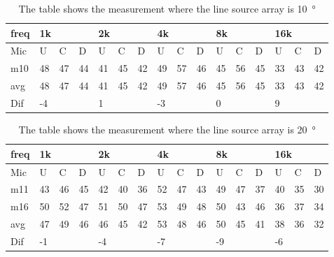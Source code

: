 \begin{table}[H]
\centering
\caption{The table shows the measurement where the line source array is \SI{10}{\degree}}
\begin{tabular}{l|l|l|l|l|l|l|l|l|l|l|l|l|lll}
freq & \multicolumn{3}{l|}{1k} & \multicolumn{3}{l|}{2k} & \multicolumn{3}{l|}{4k} & \multicolumn{3}{l|}{8k} & \multicolumn{3}{l}{16k}                                \\ \hline
Mic  & U      & C      & D     & U      & C      & D     & U      & C      & D     & U      & C      & D     & \multicolumn{1}{l|}{U}  & \multicolumn{1}{l|}{C}  & D  \\ \hline
m10   &  48    &  47    &  44    & 41     &  45    &  42    & 49     &  57     &  46    &  45     &  56    &  45    & \multicolumn{1}{l|}{33} & \multicolumn{1}{l|}{43} & 42 \\ \hline
avg &  48    &  47    &  44    & 41     &  45    &  42    & 49     &  57     &  46    &  45     &  56    &  45    & \multicolumn{1}{l|}{33} & \multicolumn{1}{l|}{43} & 42  \\ \hline  
Dif & \multicolumn{3}{l|}{-4} & \multicolumn{3}{l|}{1} & \multicolumn{3}{l|}{-3} & \multicolumn{3}{l|}{0} & \multicolumn{3}{l}{9}                                
\end{tabular}
\end{table}

\begin{table}[H]
\centering
\caption{The table shows the measurement where the line source array is \SI{20}{\degree}}
\begin{tabular}{l|l|l|l|l|l|l|l|l|l|l|l|l|lll}
freq & \multicolumn{3}{l|}{1k} & \multicolumn{3}{l|}{2k} & \multicolumn{3}{l|}{4k} & \multicolumn{3}{l|}{8k} & \multicolumn{3}{l}{16k}                                \\ \hline
Mic  & U      & C      & D     & U      & C      & D     & U      & C      & D     & U      & C      & D     & \multicolumn{1}{l|}{U}  & \multicolumn{1}{l|}{C}  & D  \\ \hline
m11    & 43     &  46    &  45    &  42    & 40     &  36    &  52    &  47     &  43    &   49    &  47    &   37   & \multicolumn{1}{l|}{40} & \multicolumn{1}{l|}{35} & 30 \\
m16    & 50     & 52     &  47    &  51    & 50     & 47     &   53   &  49     &  48    &  50     &  43    &  46    & \multicolumn{1}{l|}{36} & \multicolumn{1}{l|}{37} & 34 \\ \hline
avg &  47    &  49    &  46    &   46   &  45    &  42    &  53    &   48    &  46    &   50    &  45    &  41    & \multicolumn{1}{l|}{38} & \multicolumn{1}{l|}{36}  &32  \\ \hline  
Dif & \multicolumn{3}{l|}{-1} & \multicolumn{3}{l|}{-4} & \multicolumn{3}{l|}{-7} & \multicolumn{3}{l|}{-9} & \multicolumn{3}{l}{-6}                                
\end{tabular}
\end{table}


